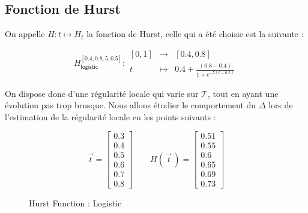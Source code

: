\subsection{Fonction de Hurst}

\begin{minipage}{0.47\linewidth}
	On appelle $H : t \mapsto H_t$ la fonction de Hurst, celle qui a été choisie est la suivante :

	$$
		H^{[0.4, 0.8, 5, 0.5]}_{\textsf{logistic}} : \begin{array}{ccc}
			[0,1] & \longrightarrow & [0.4, 0.8]
			\\
			t     & \longmapsto     & 0.4 + \frac{(0.8 - 0.4)}{1 + e^{-5(t - 0.5)}}
		\end{array}
	$$

	On dispose donc d'une régularité locale qui varie sur $\mathcal T$, tout en ayant une évolution pas trop brusque. Nous allons étudier le comportement du $\Delta$ lors de l'estimation de la régularité locale en les points suivants :

	$$
		\vec t = \begin{bmatrix} 0.3 \\ 0.4 \\ 0.5 \\ 0.6 \\ 0.7 \\ 0.8 \end{bmatrix}
		\quad\quad
		H(\, \vec t \,) =
		\begin{bmatrix}
			0.51 \\ 0.55 \\ 0.6 \\ 0.65 \\ 0.69 \\ 0.73
		\end{bmatrix}
	$$

\end{minipage}
\hfill
\begin{minipage}{0.47\linewidth}
	\begin{figure}[H]
		\centering
		\caption{Hurst Function : Logistic}
		\label{plot:hurst-logistic}
	\end{figure}
\end{minipage}


